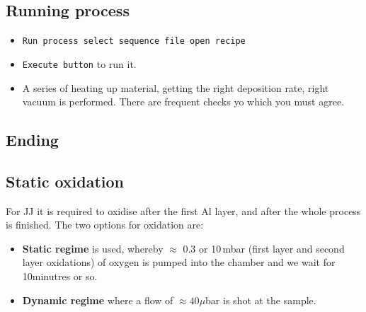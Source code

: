   \subsection{Running process}
  \begin{itemize}
  \item \texttt{Run process \ira select  sequence \ira file \ira open
      recipe}
  \item \texttt{Execute button} to run it.
  \item A series of heating up material, getting the right deposition
    rate, right  vacuum is performed.   There are frequent  checks yo
    which you must agree.
  \end{itemize}

  \subsection{Ending}

  \subsection{Static oxidation}
  For JJ  it is  required to  oxidise after the  first Al  layer, and
  after the whole process is  finished. The two options for oxidation
  are:
  \begin{itemize}
  \item \textbf{Static regime} is used, whereby $ \approx $ 0.3 or 10\,mbar
    (first layer  and second  layer oxidations)  of oxygen  is pumped
    into the chamber and we wait for 10minutres or so.
  \item \textbf{Dynamic regime} where a flow of $ \approx 40\mu$bar is shot
    at the sample.
  \end{itemize}

